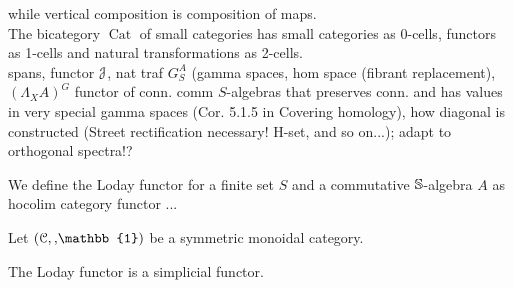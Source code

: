 
    while vertical composition is composition of maps.\\
    The bicategory $\operatorname{Cat}$ of small categories has small categories as 0-cells, functors as 1-cells and natural transformations as 2-cells.
    \\
    spans, functor $\mathcal{J}$, nat traf $G^A_S$ (gamma spaces, hom space (fibrant replacement), $(\Lambda_X A)^G$ functor of conn. comm $S$-algebras that preserves conn. and has values in very special gamma spaces (Cor. 5.1.5 in Covering homology), how diagonal is constructed (Street rectification necessary! H-set, and so on...); adapt to orthogonal spectra!?
    \begin{defn}\label{def_loday_functor}
      We define the Loday functor for a finite set $S$ and a commutative $\mathbb{S}$-algebra $A$ as hocolim category functor ...

    \end{defn}

    \begin{defn}\label{def_loday_functor_in_symmetric_monoidal_category}
      Let $(\mathcal{C},\smash, \mathbb{1})$ be a symmetric monoidal category.\\
    \end{defn}

    \begin{lem}\label{lem_loday_functor_is_simplicial}
      The Loday functor is a simplicial functor.\\
    \end{lem}

